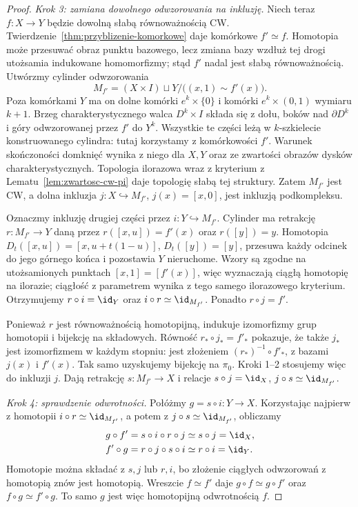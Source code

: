 \begin{proof}
\emph{Krok 3: zamiana dowolnego odwzorowania na inkluzję.}
Niech teraz $f:X\to Y$ będzie dowolną słabą równoważnością CW.
Twierdzenie~\ref{thm:przyblizenie-komorkowe} daje komórkowe
$f'\simeq f$. Homotopia może przesuwać obraz punktu bazowego,
lecz zmiana bazy wzdłuż tej drogi utożsamia indukowane
homomorfizmy; stąd $f'$ nadal jest słabą równoważnością.
Utwórzmy cylinder odwzorowania
\[
 M_{f'}=(X\times I)\sqcup Y/
       \bigl((x,1)\sim f'(x)\bigr).
\]
Poza komórkami $Y$ ma on dolne komórki $e^k\times\{0\}$
i komórki $e^k\times(0,1)$ wymiaru $k+1$.
Brzeg charakterystycznego walca $D^k\times I$ składa się
z dołu, boków nad $\partial D^k$ i góry odwzorowanej przez
$f'$ do $Y^k$. Wszystkie te części leżą w $k$-szkielecie
konstruowanego cylindra: tutaj korzystamy z komórkowości $f'$.
Warunek skończoności domknięć wynika z niego dla $X,Y$
oraz ze zwartości obrazów dysków charakterystycznych.
Topologia ilorazowa wraz z kryterium z
Lematu~\ref{lem:zwartosc-cw-pi} daje topologię słabą tej struktury.
Zatem $M_{f'}$ jest CW, a dolna inkluzja
$j:X\hookrightarrow M_{f'}$, $j(x)=[x,0]$, jest inkluzją podkompleksu.

Oznaczmy inkluzję drugiej części przez $i:Y\hookrightarrow M_{f'}$.
Cylinder ma retrakcję $r:M_{f'}\to Y$ daną przez
$r([x,u])=f'(x)$ oraz $r([y])=y$.
Homotopia $D_t([x,u])=[x,u+t(1-u)]$, $D_t([y])=[y]$,
przesuwa każdy odcinek do jego górnego końca i pozostawia $Y$
nieruchome. Wzory są zgodne na utożsamionych punktach
$[x,1]=[f'(x)]$, więc wyznaczają ciągłą homotopię na ilorazie;
ciągłość z parametrem wynika z tego samego ilorazowego kryterium.
Otrzymujemy $r\circ i=\id_Y$ oraz $i\circ r\simeq\id_{M_{f'}}$.
Ponadto $r\circ j=f'$.

Ponieważ $r$ jest równoważnością homotopijną, indukuje
izomorfizmy grup homotopii i bijekcję na składowych.
Równość $r_*\circ j_*=f'_*$ pokazuje, że także $j_*$
jest izomorfizmem w każdym stopniu: jest złożeniem
$(r_*)^{-1}\circ f'_*$, z bazami $j(x)$ i $f'(x)$.
Tak samo uzyskujemy bijekcję na $\pi_0$.
Kroki 1--2 stosujemy więc do inkluzji $j$.
Dają retrakcję $s:M_{f'}\to X$ i relacje
$s\circ j=\id_X$, $j\circ s\simeq\id_{M_{f'}}$.

\emph{Krok 4: sprawdzenie odwrotności.}
Połóżmy $g=s\circ i:Y\to X$.
Korzystając najpierw z homotopii $i\circ r\simeq\id_{M_{f'}}$,
a potem z $j\circ s\simeq\id_{M_{f'}}$, obliczamy
\[
 \begin{aligned}
 g\circ f'&=s\circ i\circ r\circ j
       \simeq s\circ j=\id_X,\\
 f'\circ g&=r\circ j\circ s\circ i
       \simeq r\circ i=\id_Y.
 \end{aligned}
\]
Homotopie można składać z $s,j$ lub $r,i$, bo złożenie
ciągłych odwzorowań z homotopią znów jest homotopią.
Wreszcie $f\simeq f'$ daje $g\circ f\simeq g\circ f'$
oraz $f\circ g\simeq f'\circ g$.
To samo $g$ jest więc homotopijną odwrotnością $f$.
\end{proof}

